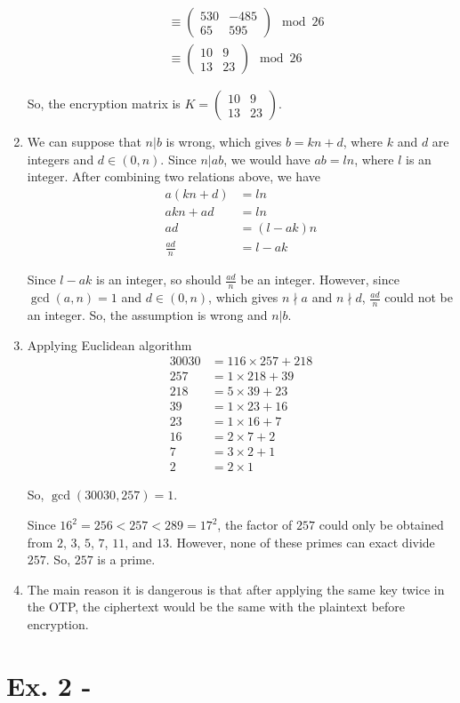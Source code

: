 \documentclass[11pt,a4paper]{article}
\begin{document}
\begin{enumerate}
\begin{align*}
		&\equiv \begin{pmatrix} 530 & -485 \\ 65 & 595 \end{pmatrix} \mod 26 \\
		&\equiv \begin{pmatrix} 10 & 9 \\ 13 & 23 \end{pmatrix} \mod 26
	\end{align*}
	\par So, the encryption matrix is $K = \begin{pmatrix} 10 & 9 \\ 13 & 23 \end{pmatrix}$.
	
	\item We can suppose that $n | b$ is wrong, which gives $b = kn + d$, where $k$ and $d$ are integers and $d \in (0, n)$. Since $n|ab$, we would have $ab = ln$, where $l$ is an integer. After combining two relations above, we have
	\begin{align*}
		a(kn + d) &= ln \\
		akn + ad &= ln \\
		ad &= (l - ak)n \\
		\frac{ad}{n} &= l - ak
	\end{align*}
	\par Since $l - ak$ is an integer, so should $\frac{ad}{n}$ be an integer. However, since $\gcd(a, n) = 1$ and $d \in (0, n)$, which gives $n \nmid a$ and $n \nmid d$, $\frac{ad}{n}$ could not be an integer. So, the assumption is wrong and $n | b$.
	
	\item Applying Euclidean algorithm
	\begin{align*}
		30030 &= 116 \times 257 + 218 \\
		257 &= 1 \times 218 + 39 \\
		218 &= 5 \times 39 + 23 \\
		39 &= 1 \times 23 + 16 \\
		23 &= 1 \times 16 + 7 \\
		16 &= 2 \times 7 + 2 \\
		7 &= 3 \times 2 + 1 \\
		2 &= 2 \times 1
	\end{align*}
	\par So, $\gcd(30030, 257) = 1$.
	\par Since $16^{2} = 256 < 257 < 289 = 17^{2}$, the factor of $257$ could only be obtained from $2$, $3$, $5$, $7$, $11$, and $13$. However, none of these primes can exact divide $257$. So, $257$ is a prime.
	
	\item The main reason it is dangerous is that after applying the same key twice in the OTP, the ciphertext would be the same with the plaintext before encryption.
\end{enumerate}


\section*{Ex. 2 - }
	
\end{document}

